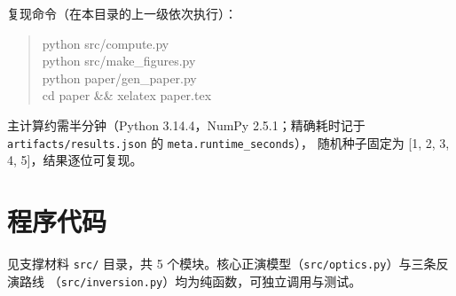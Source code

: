 \documentclass[12pt]{article}
\begin{document}
复现命令（在本目录的上一级依次执行）：
\begin{quote}\ttfamily
python src/compute.py \\
python src/make\_figures.py \\
python paper/gen\_paper.py \\
cd paper \&\& xelatex paper.tex
\end{quote}
主计算约需半分钟（Python 3.14.4，NumPy 2.5.1；精确耗时记于 \texttt{artifacts/results.json} 的 \texttt{meta.runtime\_seconds}），
随机种子固定为 [1, 2, 3, 4, 5]，结果逐位可复现。

\section{程序代码}

见支撑材料 \texttt{src/} 目录，共 5 个模块。核心正演模型（\texttt{src/optics.py}）与三条反演路线
（\texttt{src/inversion.py}）均为纯函数，可独立调用与测试。
\end{document}
